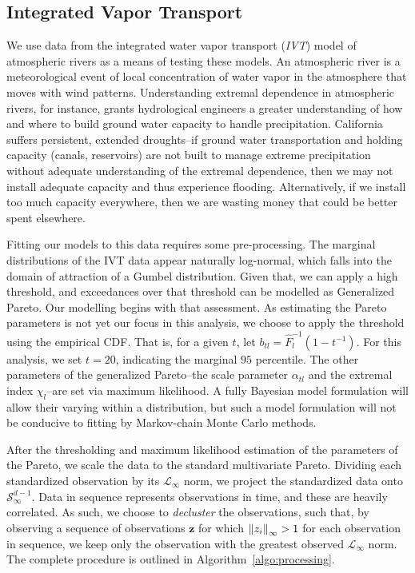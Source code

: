 \subsection{Integrated Vapor Transport}
We use data from the integrated water vapor transport (\emph{IVT}) model
  of atmospheric rivers as a means of testing these models.  An atmospheric river is a meteorological
  event of local concentration of water vapor in the atmosphere that moves with wind patterns.
  Understanding extremal dependence in atmospheric rivers, for instance, grants hydrological engineers
  a greater understanding of how and where to build ground water capacity to handle precipitation.
  California suffers persistent, extended droughts--if ground water transportation and holding capacity
  (canals, reservoirs) are not built to manage extreme precipitation without adequate understanding of
  the extremal dependence, then we may not install adequate capacity and thus experience flooding.
  Alternatively, if we install too much capacity everywhere, then we are wasting money that could be
  better spent elsewhere.

Fitting our models to this data requires some pre-processing.  The marginal distributions of the
  IVT data appear naturally log-normal, which falls into the domain of attraction of a Gumbel
  distribution.  Given that, we can apply a high threshold, and exceedances over that threshold can
  be modelled as Generalized Pareto.  Our modelling begins with that assessment.  As estimating
  the Pareto parameters is not yet our focus in this analysis, we choose to apply the threshold
  using the empirical CDF.  That is, for a given $t$, let $b_{tl} = \hat{F}_l^{-1}(1 - t^{-1})$.  For
  this analysis, we set $t = 20$, indicating the marginal $95$ percentile.  The other parameters of the
  generalized Pareto--the scale parameter $\alpha_{tl}$ and the extremal index $\chi_l$--are set via
  maximum likelihood.  A fully Bayesian model formulation will allow their varying within a
  distribution, but such a model formulation will not be conducive to fitting by Markov-chain Monte
  Carlo methods.

After the thresholding and maximum likelihood estimation of the parameters of the Pareto, we scale
  the data to the standard multivariate Pareto.  Dividing each standardized observation by its
  $\mathcal{L}_{\infty}$ norm, we project the standardized data onto $\mathcal{S}_{\infty}^{d-1}$.
  Data in sequence represents observations in time, and these are heavily correlated.  As such, we
  choose to \emph{decluster} the observations, such that, by observing a sequence of observations
  $\bm{ z}$ for which $\left\lVert z_i \right\rVert_{\infty} > 1$ for each observation in sequence, we keep only the observation
  with the greatest observed $\mathcal{L}_{\infty}$ norm.  The complete procedure is outlined in
  Algorithm~\ref{algo:processing}.

